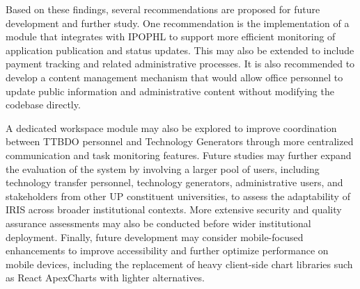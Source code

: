 Based on these findings, several recommendations are proposed for future development and further study. One recommendation is the implementation of a module that integrates with IPOPHL to support more efficient monitoring of application publication and status updates. This may also be extended to include payment tracking and related administrative processes. It is also recommended to develop a content management mechanism that would allow office personnel to update public information and administrative content without modifying the codebase directly.

A dedicated workspace module may also be explored to improve coordination between TTBDO personnel and Technology Generators through more centralized communication and task monitoring features. Future studies may further expand the evaluation of the system by involving a larger pool of users, including technology transfer personnel, technology generators, administrative users, and stakeholders from other UP constituent universities, to assess the adaptability of IRIS across broader institutional contexts. More extensive security and quality assurance assessments may also be conducted before wider institutional deployment. Finally, future development may consider mobile-focused enhancements to improve accessibility and further optimize performance on mobile devices, including the replacement of heavy client-side chart libraries such as React ApexCharts with lighter alternatives.
